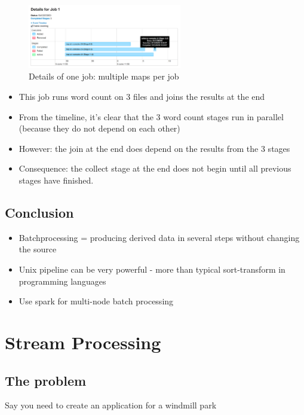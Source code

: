 \documentclass{article}
\begin{document}
\begin{figure}[H]
    \centering
    \includegraphics[width=0.6\textwidth]{spark-jobs2.png}
    \caption{Details of one job: multiple maps per job}
\end{figure}


\begin{itemize}
    \item This job runs word count on 3 files and joins the results at the end
    \item From the timeline, it's clear that the 3 word count stages run in parallel (because they do not depend on each other)
    \item However: the join at the end does depend on the results from the 3 stages
    \item Consequence: the collect stage at the end does not begin until all previous stages have finished.
\end{itemize}

\subsection{Conclusion}

\begin{itemize}
    \item Batchprocessing = producing derived data in several steps without changing the source
    \item Unix pipeline can be very powerful - more than typical sort-transform in programming languages
    \item Use spark for multi-node batch processing
\end{itemize}

\section{Stream Processing}

\subsection{The problem}

Say you need to create an application for a windmill park
\end{document}
